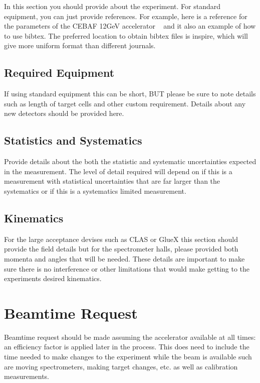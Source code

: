 \documentclass[titlepage,10pt]{article}
\begin{document}
In this section you should provide about the experiment.   For standard equipment, you can just provide references.  For example, here is a reference for the parameters of the CEBAF 12GeV accelerator ~\cite{Adderley:2024czm} and it also an example of how to use bibtex.  The preferred location to obtain bibtex files is inspire, which will give more uniform format than different journals.

\subsection{Required Equipment}

If using standard equipment this can be short, BUT please be sure to note details such as length of target cells and other custom requirement.   Details about any new detectors should be provided here.

\subsection{Statistics and Systematics}

Provide details about the both the statistic and systematic uncertainties expected in the measurement.    The level of detail required will depend on if this is a measurement with statistical uncertainties that are far larger than the systematics or if this is a systematics limited measurement.

\subsection{Kinematics}

For the large acceptance devises such as CLAS or GlueX this section should provide the field details but for the spectrometer halls, please provided both momenta and angles that will be needed.   These details are important to make sure there is no interference or other limitations that would make getting to the experiments desired kinematics.    

\section{Beamtime Request} 

Beamtime request should be made assuming the accelerator available at all times: an efficiency factor is applied later in the process.    This does need to include the time needed to make changes to the experiment while the beam is available such are moving spectrometers, making target changes, etc. as well as calibration measurements.
\end{document}
